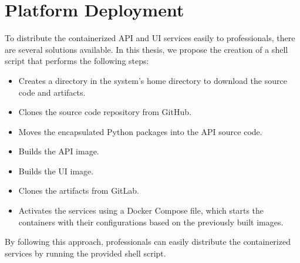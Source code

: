 \section{Platform Deployment}

To distribute the containerized API and UI services easily to professionals,
there are several solutions available. In this thesis, we propose the creation
of a shell script that performs the following steps:

\begin{itemize}
  \item Creates a directory in the system's home directory to download the source code and artifacts.
  \item Clones the source code repository from GitHub.
  \item Moves the encapsulated Python packages into the API source code.
  \item Builds the API image.
  \item Builds the UI image.
  \item Clones the artifacts from GitLab.
  \item Activates the services using a Docker Compose file, which starts the containers with their configurations based on the previously built images.
\end{itemize}

By following this approach, professionals can easily distribute the
containerized services by running the provided shell script.
